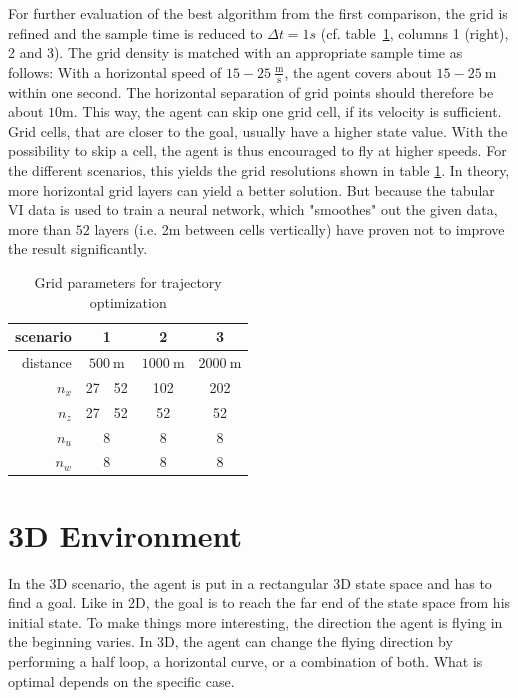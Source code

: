 For further evaluation of the best algorithm from the first comparison, the grid is refined and the sample time is reduced to $\Delta t = 1s$ (cf. table~\ref{tab:grids}, columns 1 (right), 2 and 3). The grid density is matched with an appropriate sample time as follows:
With a horizontal speed of $15-25 ~\frac{\text{m}}{\text{s}}$, the agent covers about $15-25~\text{m}$ within one second. The horizontal separation of grid points should therefore be about $10$m. This way, the agent can skip one grid cell, if its velocity is sufficient. Grid cells, that are closer to the goal, usually have a higher state value. With the possibility to skip a cell, the agent is thus encouraged to fly at higher speeds. For the different scenarios, this yields the grid resolutions shown in table \ref{tab:grids}. In theory, more horizontal grid layers can yield a better solution. But because the tabular VI data is used to train a neural network, which "smoothes" out the given data, more than $52$ layers (i.e. 2m between cells vertically) have proven not to improve the result significantly.

\begin{table}
	\begin{center}
		\begin{tabular}{r|c c c c}
			scenario &\multicolumn{2}{c}{1} & 2 & 3 \\ \hline
			distance &\multicolumn{2}{c}{$500~\text{m}$}  & $1000~\text{m}$ & $2000~\text{m}$ \\
			$n_x$ & 27 & 52 & 102 & 202 \\
			$n_z$ & 27 & 52 & 52 & 52\\
			$n_u$ &\multicolumn{2}{c}{8}& 8 & 8 \\
			$n_w$ &\multicolumn{2}{c}{8}& 8 & 8
		\end{tabular}
	\end{center}
	\caption{Grid parameters for trajectory optimization}
	\label{tab:grids}
\end{table}

\section{3D Environment}

In the 3D scenario, the agent is put in a rectangular 3D state space and has to find a goal. Like in 2D, the goal is to reach the far end of the state space from his initial state. To make things more interesting, the direction the agent is flying in the beginning varies. In 3D, the agent can change the flying direction by performing a half loop, a horizontal curve, or a combination of both. What is optimal depends on the specific case.


